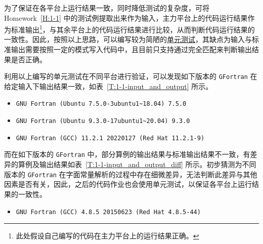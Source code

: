 为了保证在各平台上运行结果一致，同时降低测试的复杂度，可将 Homework~\ref{H:1-1} 中的测试例提取出来作为输入，主力平台上的代码运行结果作为标准输出\footnote{此处假设自己编写的代码在主力平台上的运行结果正确。}，与其余平台上的代码运行结果进行比较，从而判断代码运行结果的一致性。因此，按照以上思路，可以编写较为简陋的\href{https://github.com/iydon/CFDRust/blob/main/mae5005/test.py}{单元测试}，其缺点为输入与标准输出需要按照一定的模式写入代码中，且目前只支持通过完全匹配来判断输出结果是否正确。

利用以上编写的单元测试在不同平台进行验证，可以发现如下版本的 \texttt{GFortran} 在给定输入下输出结果一致，如表~\ref{T:1-1-input_and_output} 所示。

\begin{itemize}
    \item \verb|GNU Fortran (Ubuntu 7.5.0-3ubuntu1~18.04) 7.5.0|
    \item \verb|GNU Fortran (Ubuntu 9.3.0-17ubuntu1~20.04) 9.3.0|
    \item \verb|GNU Fortran (GCC) 11.2.1 20220127 (Red Hat 11.2.1-9)|
\end{itemize}

而在如下版本的 \texttt{GFortran} 中，部分算例的输出结果与标准输出结果不一致，有差异的算例及输出结果如表~\ref{T:1-1-input_and_output_diff} 所示。初步猜测为不同版本的 \texttt{GFortran} 在字面常量解析的过程中存在细微差异，无法判断此差异与其他因素是否有关，因此，之后的代码作业也会使用单元测试，以保证各平台上运行结果的一致性。

\begin{itemize}
    \item \verb|GNU Fortran (GCC) 4.8.5 20150623 (Red Hat 4.8.5-44)|
\end{itemize}


